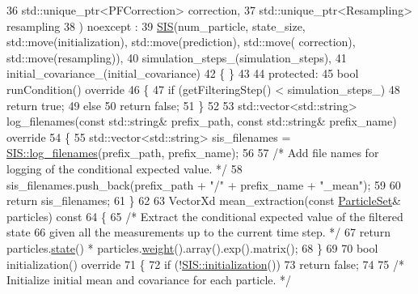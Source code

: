 \begin{DoxyCodeInclude}
36         std::unique\_ptr<PFCorrection> correction,
37         std::unique\_ptr<Resampling> resampling
38     ) noexcept :
39         \mbox{\hyperlink{classbfl_1_1SIS}{SIS}}(num\_particle, state\_size, std::move(initialization), std::move(prediction), std::move(
      correction), std::move(resampling)),
40         simulation\_steps\_(simulation\_steps),
41         initial\_covariance\_(initial\_covariance)
42     \{ \}
43 
44 \textcolor{keyword}{protected}:
45     \textcolor{keywordtype}{bool} runCondition()\textcolor{keyword}{ override}
46 \textcolor{keyword}{    }\{
47         \textcolor{keywordflow}{if} (getFilteringStep() < simulation\_steps\_)
48             \textcolor{keywordflow}{return} \textcolor{keyword}{true};
49         \textcolor{keywordflow}{else}
50             \textcolor{keywordflow}{return} \textcolor{keyword}{false};
51     \}
52 
53     std::vector<std::string> log\_filenames(\textcolor{keyword}{const} std::string& prefix\_path, \textcolor{keyword}{const} std::string& prefix\_name)\textcolor{keyword}{
       override}
54 \textcolor{keyword}{    }\{
55         std::vector<std::string> sis\_filenames = \mbox{\hyperlink{classbfl_1_1SIS_a805aef60946bfcaae4f65473dc7bd5ae}{SIS::log\_filenames}}(prefix\_path, 
      prefix\_name);
56 
57         \textcolor{comment}{/* Add file names for logging of the conditional expected value. */}
58         sis\_filenames.push\_back(prefix\_path + \textcolor{stringliteral}{"/"} + prefix\_name + \textcolor{stringliteral}{"\_mean"});
59 
60         \textcolor{keywordflow}{return}  sis\_filenames;
61     \}
62 
63     VectorXd mean\_extraction(\textcolor{keyword}{const} \mbox{\hyperlink{classbfl_1_1ParticleSet}{ParticleSet}}& particles)\textcolor{keyword}{ const}
64 \textcolor{keyword}{    }\{
65         \textcolor{comment}{/* Extract the conditional expected value of the filtered state}
66 \textcolor{comment}{           given all the measurements up to the current time step. */}
67         \textcolor{keywordflow}{return} particles.\mbox{\hyperlink{classbfl_1_1ParticleSet_a85950583083c2903f4235801cc03130c}{state}}() * particles.\mbox{\hyperlink{classbfl_1_1GaussianMixture_ada5625de6a3e2f98afb5aaa148503dad}{weight}}().array().exp().matrix();
68     \}
69 
70     \textcolor{keywordtype}{bool} initialization()\textcolor{keyword}{ override}
71 \textcolor{keyword}{    }\{
72         \textcolor{keywordflow}{if} (!\mbox{\hyperlink{classbfl_1_1SIS_a59e4f35fc05d2088e6dc13d622cafd1d}{SIS::initialization}}())
73             \textcolor{keywordflow}{return} \textcolor{keyword}{false};
74 
75         \textcolor{comment}{/* Initialize initial mean and covariance for each particle. */}

\end{DoxyCodeInclude}
